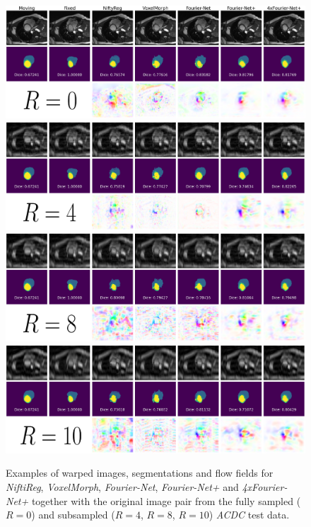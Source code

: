 \begin{figure}[H]
	\centering
	\graphicspath{{images/}{\main/images/}}
	\includegraphics[width=\textwidth]{TestExamples_Mode0.pdf}
    	\includegraphics[width=\textwidth]{TestExamples_Mode1.pdf}
    	\includegraphics[width=\textwidth]{TestExamples_Mode2.pdf}
    	\includegraphics[width=\textwidth]{TestExamples_Mode3.pdf}	
	\caption{Examples of warped images, segmentations and flow fields for \emph{NiftiReg}, \emph{VoxelMorph}, \emph{Fourier-Net}, \emph{Fourier-Net+} and \emph{4xFourier-Net+} together with the original image pair from the fully sampled ($R=0$) and subsampled ($R=4$, $R=8$, $R=10$) \emph{ACDC} test data.}
	\label{fig:TestExamples}
\end{figure}


